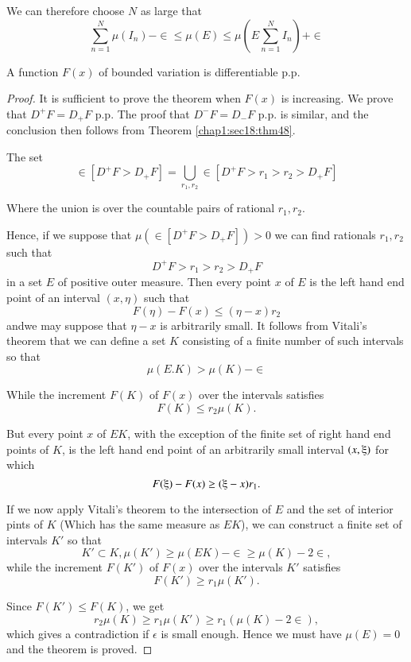  We can therefore choose $N$ as large that
$$
\sum^{N}_{n=1}\mu (I_n) - \in \le \mu (E) \le \mu (E
\sum^{N}_{n=1} I_n) + \in
$$
 
 \begin{theorem}\label{chap1:sec18:thm50}
   A function $F(x)$ of bounded variation is differentiable p.p. 
 \end{theorem}

\begin{proof}
It is sufficient to prove
 the theorem when $F(x)$ is increasing. We prove that $D^+F= D_+F$
 p.p. The proof that $ D ^- F= D_- F$ p.p. is similar, and the
 conclusion then follows from Theorem \ref{chap1:sec18:thm48}. 

The set
$$
\in [D^+F > D_+F]= \bigcup_{r_1, r_2} \in [ D^+F > r_1 >r_2 >
  D_+F]
$$

Where the union is over the countable pairs of rational $r_1, r_2.$

Hence, if we suppose that $ \mu (\in [D^+ F> D_+ F]) > 0$ we can find
rationals $r_1,r_2$ such that  
$$
D^+ F > r_1 > r_2 > D_+ F
$$
in a set $E$ of positive outer measure. Then every point $x$ of $E$ is the
left hand end point of an interval $(x, \eta)$ such that 
$$ 
F(\eta) -F(x) \le (\eta -x) r_2
$$
and\pageoriginale we may suppose that $\eta -x$ is arbitrarily small. It follows
from Vitali's theorem that we can define a set $K$ consisting of a
finite number of such intervals so that  
$$ 
\mu (E. K) > \mu (K) -\in
$$
 
While the increment $F(K)$ of $F(x)$ over the intervals satisfies
$$
F(K) \le r_2 \mu (K).
$$

But every point $x$ of $EK$, with the exception of the finite set of right
hand end points of $K$, is the left hand end point of an arbitrarily
small interval $(x, \xiup)$ for which 
$$ 
F(\xiup) -F(x) \ge (\xiup - x) r_1.
$$

If we now apply Vitali's theorem to the intersection of $E$  and the set
of interior pints of $K$ (Which has the same measure as $EK$), we can
construct a finite set of intervals $K'$ so that  
$$
K' \subset K, \mu (K') \ge \mu (E K) - \in \ge \mu(K) - 2 \in ,
$$
while the increment $F(K')$ of $F(x)$ over the intervals $K'$ satisfies 
$$
F(K')\ge r_1 \mu (K').
$$

Since $F(K') \le F(K)$, we get
$$
r_2 \mu (K) \ge r_1 \mu (K') \ge r_1 (\mu (K) - 2 \in),
$$
which gives a contradiction if $\epsilon$ is small enough. Hence we must have
$\mu (E) =0 $ and the theorem is proved. 
\end{proof}

